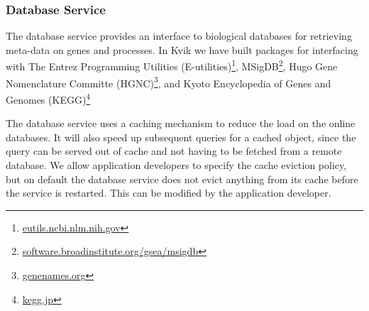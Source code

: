 


\subsubsection*{Database Service} 
The database service provides an interface to biological databases for
retrieving meta-data on genes and processes. 
In Kvik we have built packages for
interfacing with The Entrez Programming Utilities
(E-utilities)\footnote{\url{eutils.ncbi.nlm.nih.gov}},
MSigDB\footnote{\url{software.broadinstitute.org/gsea/msigdb}}, Hugo Gene
Nomenclature Committe (HGNC)\footnote{\url{genenames.org}}, and Kyoto Encyclopedia
of Genes and Genomes (KEGG)\footnote{\url{kegg.jp}}

The database service uses a caching mechanism to reduce the load on the online
databases. It will also speed up subsequent queries for a cached object, since
the query can be served out of cache and not having to be fetched from a remote
database. We allow application developers to specify the cache eviction policy,
but on default the database service does not evict anything from its cache
before the service is restarted. This can be modified by the application
developer. 



